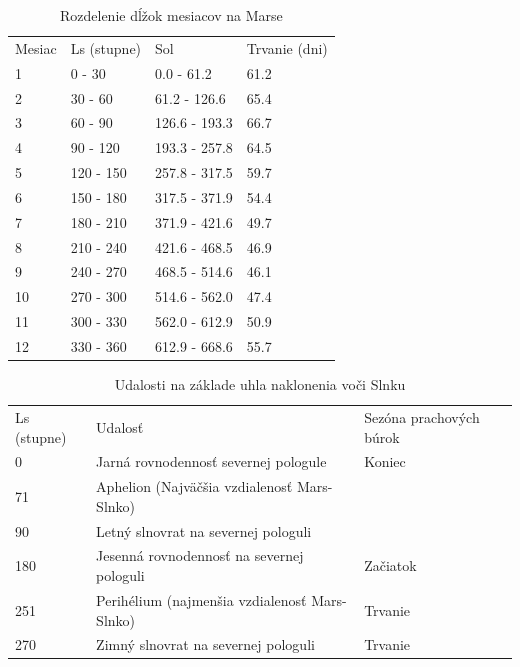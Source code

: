 \begin{table}[!htbp]
\caption{Rozdelenie dĺžok mesiacov na Marse}
\centering
\begin{tabular}{llll}
Mesiac  & Ls (stupne)   & Sol            & Trvanie (dni)    \\
1       & 0 - 30        & 0.0 - 61.2     & 61.2             \\
2       & 30 - 60       & 61.2 - 126.6   & 65.4             \\
3       & 60 - 90       & 126.6 - 193.3  & 66.7             \\
4       & 90 - 120      & 193.3 - 257.8  & 64.5             \\
5       & 120 - 150     & 257.8 - 317.5  & 59.7             \\
6       & 150 - 180     & 317.5 - 371.9  & 54.4             \\
7       & 180 - 210     & 371.9 - 421.6  & 49.7             \\
8       & 210 - 240     & 421.6 - 468.5  & 46.9             \\
9       & 240 - 270     & 468.5 - 514.6  & 46.1             \\
10      & 270 - 300     & 514.6 - 562.0  & 47.4             \\
11      & 300 - 330     & 562.0 - 612.9  & 50.9             \\
12      & 330 - 360     & 612.9 - 668.6  & 55.7                                                     
\end{tabular}
\end{table}

\begin{table}[!htbp]
\caption{Udalosti na základe uhla naklonenia voči Slnku }
\centering
\begin{tabular}{lll}
Ls (stupne) & Udalosť                                       & Sezóna prachových búrok   \\
0           & Jarná rovnodennosť severnej pologule          & Koniec                    \\
71          & Aphelion (Najväčšia vzdialenosť Mars-Slnko)   &                           \\
90          & Letný slnovrat na severnej pologuli           &                           \\
180         & Jesenná rovnodennosť na severnej pologuli     & Začiatok                  \\
251         & Perihélium (najmenšia vzdialenosť Mars-Slnko) & Trvanie                   \\
270         & Zimný slnovrat na severnej pologuli           & Trvanie 
\end{tabular}
\end{table}

